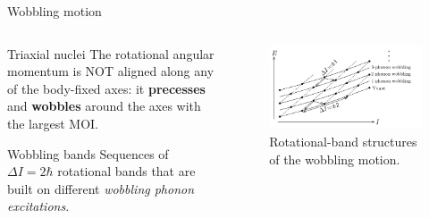 \documentclass{beamer}
\begin{document}
\begin{frame}{Wobbling motion}
  \begin{columns}
    \begin{column}{0.47\textwidth}
    \begin{block}{Triaxial nuclei}
    The rotational angular momentum is NOT aligned along any of the body-fixed axes: it \textbf{precesses} and \textbf{wobbles} around the axes with the largest MOI. 
    \end{block}
  \begin{block}{Wobbling bands}
  Sequences of $\Delta I=2\hbar$ rotational bands that are built on different \textit{wobbling phonon excitations}.
  \end{block}
    \end{column}
    \begin{column}{0.53\textwidth}  %
   \begin{figure}
     \centering
     \includegraphics[scale=0.15]{figs/wobblingBands.png}
     \caption{Rotational-band structures of the wobbling motion.}
   \end{figure}
    \end{column}
    \end{columns}
\end{frame}
\end{document}
